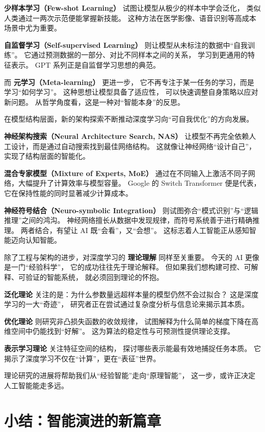 {\bf 少样本学习（Few-shot Learning）} 试图让模型从极少的样本中学会泛化，  
类似人类通过一两次示范便能掌握新技能。  
这种方法在医学影像、语音识别等高成本场景中尤为重要。  

{\bf 自监督学习（Self-supervised Learning）} 则让模型从未标注的数据中“自我训练”。  
它通过预测数据的一部分、对比不同样本之间的关系，  
学习到更通用的特征表示。  
GPT 系列正是自监督学习思想的典范。  

而 {\bf 元学习（Meta-learning）} 更进一步，  
它不再专注于某一任务的学习，而是学习“如何学习”。  
这种思想让模型具备了适应性，  
可以快速调整自身策略以应对新问题。  
从哲学角度看，这是一种对“智能本身”的反思。

在模型结构层面，新的架构探索不断推动深度学习向“可自我优化”的方向发展。  

{\bf 神经架构搜索（Neural Architecture Search, NAS）}  
让模型不再完全依赖人工设计，而是通过自动搜索找到最佳网络结构。  
这就像让神经网络“设计自己”，实现了结构层面的智能化。  

{\bf 混合专家模型（Mixture of Experts, MoE）}  
通过在不同输入上激活不同子网络，大幅提升了计算效率与模型容量。  
Google 的 Switch Transformer 便是代表，它在保持性能的同时显著减少计算成本。  

{\bf 神经符号结合（Neuro-symbolic Integration）}  
则试图弥合“模式识别”与“逻辑推理”之间的鸿沟。  
神经网络擅长从数据中发现规律，而符号系统善于进行精确推理。  
两者结合，有望让 AI 既“会看”，又“会想”。  
这标志着人工智能正从感知智能迈向认知智能。

除了工程与架构的进步，对深度学习的 {\bf 理论理解} 同样至关重要。  
今天的 AI 更像是一门“经验科学”，  
它的成功往往先于理论解释。  
但如果我们想构建可控、可解释、可验证的智能系统，  
就必须回到理论的怀抱。  

{\bf 泛化理论} 关注的是：为什么参数量远超样本量的模型仍然不会过拟合？  
这是深度学习的一大“奇迹”，  
研究者正在尝试通过复杂度分析与信息论来揭示其本质。  

{\bf 优化理论} 则研究非凸损失函数的收敛规律，  
试图解释为什么简单的梯度下降在高维空间中仍能找到“好解”。  
这为算法的稳定性与可预测性提供理论支撑。  

{\bf 表示学习理论} 关注特征空间的结构，  
探讨哪些表示能最有效地捕捉任务本质。  
它揭示了深度学习不仅在“计算”，更在“表征”世界。  

理论研究的进展将帮助我们从“经验智能”走向“原理智能”，  
这一步，或许正决定人工智能能走多远。

\section{小结：智能演进的新篇章}

